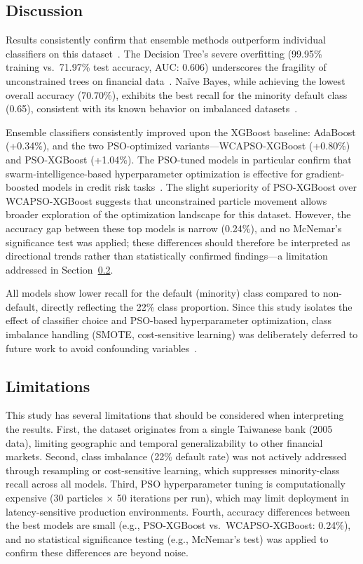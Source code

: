 \documentclass[sigconf]{acmart}
\begin{document}
\subsection{Discussion}

Results consistently confirm that ensemble methods outperform individual classifiers on this dataset~\cite{louzada2016classification,tsai2008using}. The Decision Tree's severe overfitting (99.95\% training vs.\ 71.97\% test accuracy, AUC: 0.606) underscores the fragility of unconstrained trees on financial data~\cite{xia2017boosted}. Na\"{i}ve Bayes, while achieving the lowest overall accuracy (70.70\%), exhibits the best recall for the minority default class (0.65), consistent with its known behavior on imbalanced datasets~\cite{bekkar2013evaluation}.

Ensemble classifiers consistently improved upon the XGBoost baseline: AdaBoost (+0.34\%), and the two PSO-optimized variants---WCAPSO-XGBoost (+0.80\%) and PSO-XGBoost (+1.04\%). The PSO-tuned models in particular confirm that swarm-intelligence-based hyperparameter optimization is effective for gradient-boosted models in credit risk tasks~\cite{kennedy1995pso,wang2013credit,zhang2025xgboost}. The slight superiority of PSO-XGBoost over WCAPSO-XGBoost suggests that unconstrained particle movement allows broader exploration of the optimization landscape for this dataset. However, the accuracy gap between these top models is narrow (0.24\%), and no McNemar's significance test was applied; these differences should therefore be interpreted as directional trends rather than statistically confirmed findings---a limitation addressed in Section~\ref{sec:limitations}.

All models show lower recall for the default (minority) class compared to non-default, directly reflecting the 22\% class proportion. Since this study isolates the effect of classifier choice and PSO-based hyperparameter optimization, class imbalance handling (SMOTE, cost-sensitive learning) was deliberately deferred to future work to avoid confounding variables~\cite{brown2012experiment}.

\subsection{Limitations}
\label{sec:limitations}
This study has several limitations that should be considered when interpreting the results. First, the dataset originates from a single Taiwanese bank (2005 data), limiting geographic and temporal generalizability to other financial markets. Second, class imbalance (22\% default rate) was not actively addressed through resampling or cost-sensitive learning, which suppresses minority-class recall across all models. Third, PSO hyperparameter tuning is computationally expensive (30 particles $\times$ 50 iterations per run), which may limit deployment in latency-sensitive production environments. Fourth, accuracy differences between the best models are small (e.g., PSO-XGBoost vs.\ WCAPSO-XGBoost: 0.24\%), and no statistical significance testing (e.g., McNemar's test) was applied to confirm these differences are beyond noise.
\end{document}
